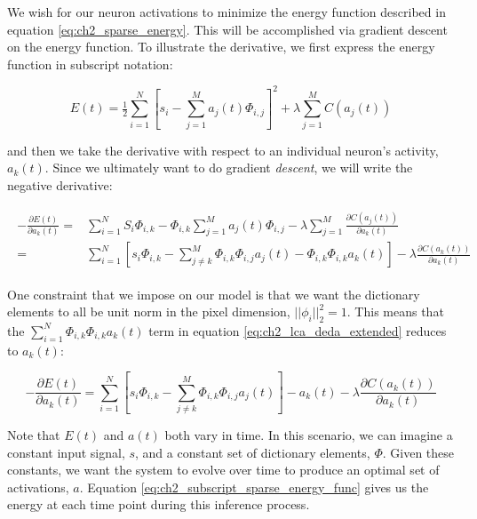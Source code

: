 We wish for our neuron activations to minimize the energy function described in equation \eqref{eq:ch2_sparse_energy}. This will be accomplished via gradient descent on the energy function. To illustrate the derivative, we first express the energy function in subscript notation:

\begin{equation}\label{eq:ch2_subscript_sparse_energy_func}
    E(t) = \tfrac{1}{2} \sum\limits_{i=1}^{N} \left[ s_{i} - \sum\limits_{j=1}^{M}a_{j}(t) \Phi_{i,j} \right]^{2} + \lambda \sum\limits_{j=1}^{M} C(a_{j}(t))
\end{equation}

and then we take the derivative with respect to an individual neuron's activity, $a_{k}(t)$. Since we ultimately want to do gradient \textit{descent}, we will write the negative derivative:

\begin{align}\label{eq:ch2_lca_deda_extended}
\begin{split}
    - \frac{\partial E(t)}{\partial a_{k}(t)}
    =
        &\sum\limits_{i=1}^{N} S_{i} \Phi_{i,k} -
        \Phi_{i,k}\sum\limits_{j=1}^{M}a_{j}(t) \Phi_{i,j} -
        \lambda \sum\limits_{j=1}^{M}\frac{\partial C(a_{j}(t))}{\partial a_{k}(t)} \\
    =
        &\sum\limits_{i=1}^{N} \left[ s_{i} \Phi_{i,k} -
        \sum\limits_{j \neq k}^{M} \Phi_{i,k} \Phi_{i,j} a_{j}(t) - \Phi_{i,k}\Phi_{i,k}a_{k}(t) \right] -
        \lambda \frac{\partial C(a_{k}(t))}{\partial a_{k}(t)}
\end{split}
\end{align}

One constraint that we impose on our model is that we want the dictionary elements to all be unit norm in the pixel dimension, $||\phi_{i}||_2^2 = 1$. This means that the $\sum_{i=1}^{N}\Phi_{i,k}\Phi_{i,k}a_{k}(t)$ term in equation \eqref{eq:ch2_lca_deda_extended} reduces to $a_k(t)$:

\begin{equation}\label{eq:ch2_lca_deda}
    -\frac{\partial E(t)}{\partial a_{k}(t)} =
    \sum\limits_{i=1}^{N} \left[ s_{i} \Phi_{i,k} -
    \sum\limits_{j \neq k}^{M} \Phi_{i,k} \Phi_{i,j} a_{j}(t) \right] - a_{k}(t) -
    \lambda \frac{\partial C(a_{k}(t))}{\partial a_{k}(t)}
\end{equation}

Note that $E(t)$ and $a(t)$ both vary in time. In this scenario, we can imagine a constant input signal, $s$, and a constant set of dictionary elements, $\Phi$. Given these constants, we want the system to evolve over time to produce an optimal set of activations, $a$. Equation \eqref{eq:ch2_subscript_sparse_energy_func} gives us the energy at each time point during this inference process.

